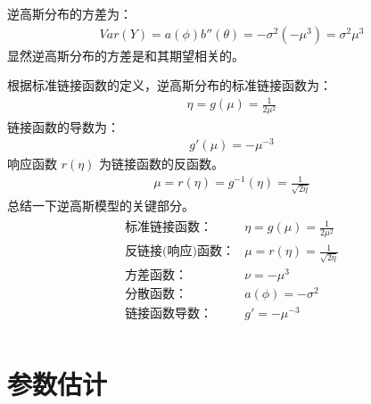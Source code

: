 \documentclass[letterpaper,10pt,english]{sphinxmanual}
\begin{document}
逆高斯分布的方差为：
\begin{equation}\label{equation:逆高斯模型/content:逆高斯模型/content:5}
\begin{split}Var(Y) = a(\phi)b''(\theta) = -\sigma^2(-\mu^3) = \sigma^2 \mu^3\end{split}
\end{equation}
显然逆高斯分布的方差是和其期望相关的。

根据标准链接函数的定义，逆高斯分布的标准链接函数为：
\begin{equation}\label{equation:逆高斯模型/content:逆高斯模型/content:6}
\begin{split}\eta = g(\mu) = \frac{1}{2\mu^2}\end{split}
\end{equation}
链接函数的导数为：
\begin{equation}\label{equation:逆高斯模型/content:逆高斯模型/content:7}
\begin{split}g'(\mu) = -\mu^{-3}\end{split}
\end{equation}
响应函数 \(r(\eta)\) 为链接函数的反函数。
\begin{equation}\label{equation:逆高斯模型/content:逆高斯模型/content:8}
\begin{split}\mu = r(\eta)=g^{-1}(\eta)=\frac{1}{\sqrt{2\eta}}\end{split}
\end{equation}
总结一下逆高斯模型的关键部分。
\begin{align}\label{equation:逆高斯模型/content:逆高斯模型/content:9}\!\begin{aligned}
\text{标准链接函数：}  & \eta= g(\mu) = \frac{1}{2\mu^2}\\
\text{反链接(响应)函数：}  & \mu=r(\eta) = \frac{1}{\sqrt{2\eta}}\\
\text{方差函数：}  & \nu= -\mu^3\\
\text{分散函数：}  & a(\phi) = -\sigma^2\\
\text{链接函数导数：} & g'= -\mu^{-3}\\
\end{aligned}\end{align}

\section{参数估计}
\label{\detokenize{_u9006_u9ad8_u65af_u6a21_u578b/content:id4}}
\end{document}
